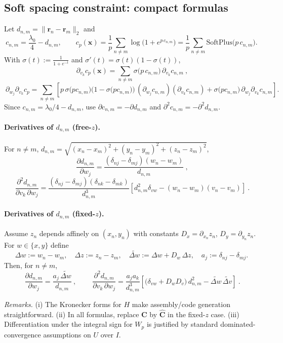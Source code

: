 \documentclass[11pt,letterpaper]{article}
\theoremstyle{definition}
\theoremstyle{plain}
\begin{document}
\subsection*{Soft spacing constraint: compact formulas}
Let $d_{n,m}=\|\mathbf r_n-\mathbf r_m\|_2$ and
\[
c_{n,m}=\frac{\lambda_0}{4}-d_{n,m},\qquad
c_p(\mathbf x)=\frac1p\sum_{n\ne m}\log\!\big(1+e^{p\,c_{n,m}}\big)
=\frac1p\sum_{n\ne m}\mathrm{SoftPlus}\!\big(p\,c_{n,m}\big).
\]
With $\sigma(t):=\frac{1}{1+e^{-t}}$ and $\sigma'(t)=\sigma(t)(1-\sigma(t))$,
\[
\boxed{\ \partial_{v_k} c_p(\mathbf x)=\sum_{n\ne m}\sigma\!\big(p\,c_{n,m}\big)\,\partial_{v_k}c_{n,m}\ },
\]
\[
\boxed{\ \partial_{w_j}\partial_{v_k} c_p
=\sum_{n\ne m}\!\left[
p\,\sigma\!\big(p c_{n,m}\big)\!\big(1-\sigma\!\big(p c_{n,m}\big)\big)\,
(\partial_{w_j}c_{n,m})(\partial_{v_k}c_{n,m})
+\sigma\!\big(p c_{n,m}\big)\,\partial_{w_j}\partial_{v_k} c_{n,m}
\right]\! }.
\]
Since $c_{n,m}=\lambda_0/4-d_{n,m}$, use $\partial c_{n,m}=-\partial d_{n,m}$ and $\partial^2 c_{n,m}=-\partial^2 d_{n,m}$.

\paragraph{Derivatives of $d_{n,m}$ (free-$z$).}
For $n\ne m$, $d_{n,m}=\sqrt{(x_n-x_m)^2+(y_n-y_m)^2+(z_n-z_m)^2}$,
\[
\boxed{\ \frac{\partial d_{n,m}}{\partial w_j}
=\frac{(\delta_{nj}-\delta_{mj})(w_n-w_m)}{d_{n,m}}\ },
\]
\[
\boxed{\ \frac{\partial^2 d_{n,m}}{\partial v_k\,\partial w_j}
=\frac{(\delta_{nj}-\delta_{mj})(\delta_{nk}-\delta_{mk})}{d_{n,m}^3}
\left[d_{n,m}^2\delta_{vw}-(w_n-w_m)(v_n-v_m)\right]\ }.
\]

\paragraph{Derivatives of $d_{n,m}$ (fixed-$z$).}
Assume $z_n$ depends affinely on $(x_n,y_n)$ with constants $D_x=\partial_{x_n}z_n$, $D_y=\partial_{y_n}z_n$. For $w\in\{x,y\}$ define
\[
\Delta w:=w_n-w_m,\quad \Delta z:=z_n-z_m,\quad
\widetilde{\Delta w}:=\Delta w + D_w\,\Delta z,\quad
a_j:=\delta_{nj}-\delta_{mj}.
\]
Then, for $n\ne m$,
\[
\boxed{\ \frac{\partial d_{n,m}}{\partial w_j}
=\frac{a_j\,\widetilde{\Delta w}}{d_{n,m}}\ },
\qquad
\boxed{\ \frac{\partial^2 d_{n,m}}{\partial v_k\,\partial w_j}
=\frac{a_j a_k}{d_{n,m}^3}
\left[\big(\delta_{vw}+D_w D_v\big)\,d_{n,m}^2-\widetilde{\Delta w}\,\widetilde{\Delta v}\right]\ }.
\]

\medskip
\noindent\textit{Remarks.} (i) The Kronecker forms for $H$ make assembly/code generation straightforward. (ii) In all formulas, replace $\mathbf C$ by $\widehat{\mathbf C}$ in the fixed-$z$ case. (iii) Differentiation under the integral sign for $W_p$ is justified by standard dominated-convergence assumptions on $U$ over $I$.
\end{document}
